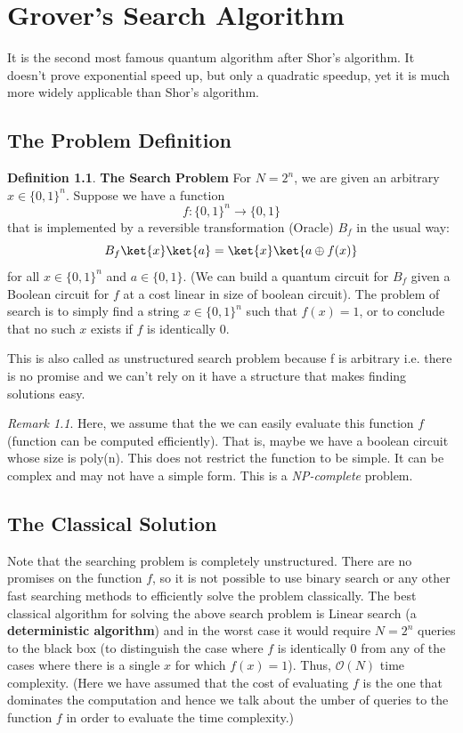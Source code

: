 \documentclass[12pt, oneside]{book}
\theoremstyle{definition}
\newtheorem{definition}{Definition}[section]
\theoremstyle{definition}
\theoremstyle{remark}
\newtheorem*{remark}{Remark}
\begin{document}
\chapter{Grover's Search Algorithm}
It is the second most famous quantum algorithm after Shor's algorithm.
It doesn't prove exponential speed up, but only a quadratic speedup, yet it is much more
widely applicable than Shor's algorithm.

\section{The Problem Definition}
\begin{definition}
    \textbf{The Search Problem} For $N = 2^n$, we are given an arbitrary $x \in \{0, 1\}^n$.
    Suppose we have a function
    \[
        f:\{0,1\}^n \rightarrow \{0,1\}
    \]
    that is implemented by a reversible transformation (Oracle) $B_f$ in the usual way:
    \[
        B_f\ket{x}\ket{a}=\ket{x}\ket{a\oplus f(x)}
    \]
    for all $x \in \{0,1\}^n$ and $a \in \{0,1\}$. (We can build a quantum circuit for $B_f$ given a Boolean circuit for $f$ at a cost linear in size of boolean circuit). The problem of search is to simply find a string 
    $ x \in \{0,1\}^n$ such that $f(x)=1$, or to conclude that no such $x$ exists if $f$ is identically 0. 

    This is also called as unstructured search problem because f is arbitrary i.e. there is no promise and we can't rely on it have a structure that makes finding solutions easy.
    \begin{remark}Here, we assume that the we can easily evaluate this function $f$ (function can be computed efficiently). That is, maybe we have a boolean circuit whose size is poly(n). This does not restrict the function to be simple. It can be complex and may not have a simple form. This is a \textit{NP-complete} problem. 
    \end{remark}
\end{definition}

\section{The Classical Solution}
Note that the searching problem is completely unstructured. There are no promises on the function $f$, so it is not possible to use binary search or any 
other fast searching methods to efficiently solve the problem classically. The best classical algorithm for solving the above search problem is Linear search (a \textbf{deterministic algorithm}) and in the worst case it would require $N=2^n$ queries to the black box (to distinguish the case where $f$ is identically 0 from any of the cases where there is a single $x$ for which $f(x)=1$). Thus, $\mathcal{O}(N)$ time complexity. (Here we have assumed that the cost of evaluating $f$ is the one that dominates the computation and hence we talk about the umber of queries to the function $f$ in order to evaluate the time complexity.)
\end{document}
